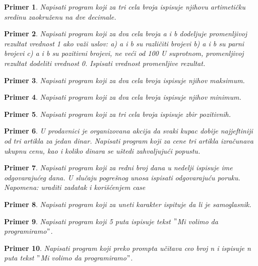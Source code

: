 \documentclass[a4paper]{article}
\newtheorem{primer}{Primer}[section]
\begin{document}
\begin{primer}
Napisati program koji za tri cela broja ispisuje
njihovu artimetičku sredinu zaokruženu na dve decimale.
\end{primer}

\begin{primer}
Napisati program koji za dva cela broja a i b dodeljuje
promenljivoj rezultat vrednost 1 ako važi uslov:
a) a i b su različiti brojevi
b) a i b su parni brojevi
c) a i b su pozitivni brojevi, ne veći od 100
U suprotnom, promenljivoj rezultat dodeliti vrednost 0. Ispisati vrednost promenljive
rezultat.
\end{primer}

\begin{primer}
Napisati program koji za dva cela broja ispisuje
njihov maksimum.
\end{primer}

\begin{primer}
Napisati program koji za dva cela broja ispisuje
njihov minimum.
\end{primer}

\begin{primer}
Napisati program koji za tri cela broja ispisuje zbir
pozitivnih.
\end{primer}

\begin{primer}
U prodavnici je organizovana akcija da svaki kupac dobije
najjeftiniji od tri artikla za jedan dinar. Napisati program koji za cene
tri artikla izračunava ukupnu cenu, kao i koliko dinara se uštedi zahvaljujući
popustu.
\end{primer}


\begin{primer}
Napisati program koji za redni broj dana u nedelji ispisuje
ime odgovarajućeg dana. U slučaju pogrešnog unosa ispisati odgovarajuću
poruku. Napomena: uraditi zadatak i korišćenjem case
\end{primer}

\begin{primer}
Napisati program koji za uneti karakter ispituje da li je
samoglasnik.
\end{primer}

\begin{primer}
Napisati program koji 5 puta ispisuje tekst $"$Mi volimo da
programiramo$"$.
\end{primer}

\begin{primer}
Napisati program koji preko prompta učitava ceo broj n i ispisuje n puta
tekst $"$Mi volimo da
programiramo$"$.
\end{primer}
\end{document}
